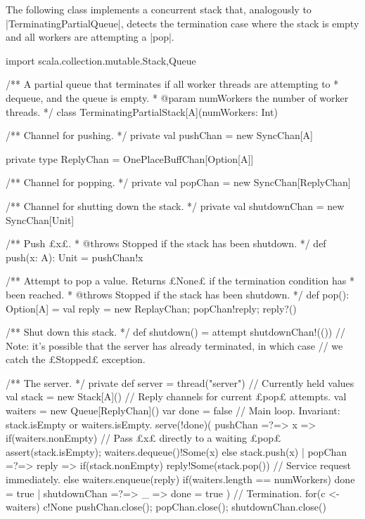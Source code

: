 
\begin{answerI}
The following class implements a concurrent stack that, analogously to
|TerminatingPartialQueue|, detects the termination case where the stack is
empty and all workers are attempting a |pop|.
%
\begin{scala}
import scala.collection.mutable.{Stack,Queue}

/** A partial queue that terminates if all worker threads are attempting to
  * dequeue, and the queue is empty.
  * @param numWorkers the number of worker threads. */
class TerminatingPartialStack[A](numWorkers: Int){
  /** Channel for pushing. */
  private val pushChan = new SyncChan[A]

  private type ReplyChan = OnePlaceBuffChan[Option[A]]

  /** Channel for popping. */
  private val popChan = new SyncChan[ReplyChan]

  /** Channel for shutting down the stack. */
  private val shutdownChan = new SyncChan[Unit]

  /** Push £x£.
    * @throws Stopped if the stack has been shutdown. */
  def push(x: A): Unit = pushChan!x

  /** Attempt to pop a value.  Returns £None£ if the termination condition has
    * been reached.
    * @throws Stopped if the stack has been shutdown. */
  def pop(): Option[A] = { 
    val reply = new ReplayChan; popChan!reply; reply?() 
  }

  /** Shut down this stack. */
  def shutdown() = attempt{ shutdownChan!(()) }{ }
  // Note: it's possible that the server has already terminated, in which case
  // we catch the £Stopped£ exception.

  /** The server. */
  private def server = thread("server"){
    // Currently held values
    val stack = new Stack[A]()
    // Reply channels for current £pop£ attempts.
    val waiters = new Queue[ReplyChan]() 
    var done = false
    // Main loop.  Invariant: stack.isEmpty or waiters.isEmpty.
    serve(!done)(
      pushChan =?=> { x => 
        if(waiters.nonEmpty){ // Pass £x£ directly to a waiting £pop£
          assert(stack.isEmpty); waiters.dequeue()!Some(x)
        }
        else stack.push(x)
      }
      |  
      popChan =?=> { reply =>
        if(stack.nonEmpty) 
          reply!Some(stack.pop()) // Service request immediately.
        else{
          waiters.enqueue(reply)
          if(waiters.length == numWorkers) done = true
        }
      }
      |
      shutdownChan =?=> { _ => done = true }
    )
    // Termination.
    for(c <- waiters) c!None
    pushChan.close(); popChan.close(); shutdownChan.close()
  }

}
\end{scala}
\end{answerI}
